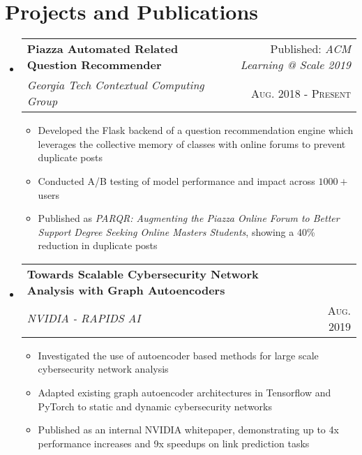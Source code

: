 \documentclass[letterpaper,11pt]{article}
\makeatletter
\newcommand{\resumePlainItem}[1]{
  \item\small{#1 \vspace{-2pt}}
}
\newcommand{\resumeSubheading}[4]{
  \vspace{-1pt}\item[]
    \begin{tabular*}{0.97\textwidth}{l@{\extracolsep{\fill}}r}
      \textbf{#1} & #2 \\
      \textit{\small#3} & \textsc{\small #4} \\ %
    \end{tabular*}\vspace{-5pt}
}
\newcommand{\resumeSubHeadingListStart}{\begin{itemize}[leftmargin=*]}
\newcommand{\resumeSubHeadingListEnd}{\end{itemize}}
\newcommand{\resumeItemListStart}{\begin{itemize}}
\newcommand{\resumeItemListEnd}{\end{itemize}\vspace{-5pt}}
\newenvironment{resumeItemList}{\resumeItemListStart}{\resumeItemListEnd}
\newenvironment{resumeSubheadingList}{\resumeSubHeadingListStart}{\resumeSubHeadingListEnd}
\makeatother
\begin{document}
\section{Projects and Publications}
  \begin{resumeSubheadingList}
    \resumeSubheading
    {Piazza Automated Related Question Recommender}{Published: \textit{ACM Learning @ Scale 2019}}
    {Georgia Tech Contextual Computing Group}{Aug. 2018 - Present}
    \begin{resumeItemList}
      \resumePlainItem{Developed the Flask backend of a question recommendation engine which leverages the collective
      memory of classes with online forums to prevent duplicate posts}
      \resumePlainItem{Conducted A/B testing of model performance and impact across $1000+$ users}
      \resumePlainItem{Published as \textit{PARQR: Augmenting the Piazza Online Forum to Better Support Degree Seeking Online Masters Students},
      showing a 40\% reduction in duplicate posts} %
    \end{resumeItemList}

    \resumeSubheading
    {Towards Scalable Cybersecurity Network Analysis with Graph Autoencoders}{}
    {NVIDIA - RAPIDS AI}{Aug. 2019}
    \begin{resumeItemList}
      \resumePlainItem{Investigated the use of autoencoder based methods for large scale cybersecurity network analysis}
      \resumePlainItem{Adapted existing graph autoencoder architectures in Tensorflow and PyTorch to static and dynamic
      cybersecurity networks}
      \resumePlainItem{Published as an internal NVIDIA whitepaper, demonstrating up to 4x performance increases and 
      9x speedups on link prediction tasks}
    \end{resumeItemList}


\end{resumeSubheadingList}
\end{document}
